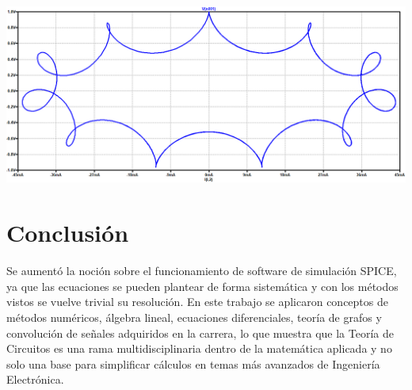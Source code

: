 \documentclass[10pt,a4paper]{article} %
\begin{document}
\begin{center}
		\includegraphics[scale=0.4]{simulacion105}
	
\end{center}


\newpage

	\section{Conclusión}
	
	
	
	Se aumentó la noción sobre el funcionamiento de software de simulación SPICE, ya que las ecuaciones se pueden plantear de forma sistemática y con los métodos vistos se vuelve trivial su resolución. En este trabajo se aplicaron conceptos de métodos numéricos, álgebra lineal, ecuaciones diferenciales, teoría de grafos y convolución de señales adquiridos en la carrera, lo que muestra que la Teoría de Circuitos es una rama multidisciplinaria dentro de la matemática aplicada y no solo una base para simplificar cálculos en temas más avanzados de Ingeniería Electrónica.
	
\end{document}
